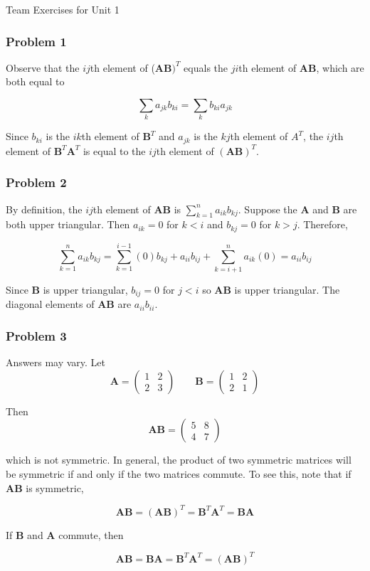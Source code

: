 \documentclass{beamer}
\begin{document}
\begin{frame}
\begin{center}
\Huge Team Exercises for Unit 1
\end{center}
\end{frame}

\begin{frame}
\frametitle{Problem 1}
Observe that the $ij$th element of ($\mathbf{AB})^T$ equals the $ji$th element of $\mathbf{AB}$, which are both equal to 

$$ \sum_k a_{jk}b_{ki} = \sum_k b_{ki} a_{jk}$$

Since $b_{ki}$ is the $ik$th element of $\mathbf{B}^T$ and $a_{jk}$ is the $kj$th element of $A^T$, the $ij$th element of $\mathbf{B}^T\mathbf{A}^T$ is equal to the $ij$th element of $\mathbf{(AB)}^T$.
\end{frame}

\begin{frame}
\frametitle{Problem 2}
By definition, the $ij$th element of $\mathbf{AB}$ is $\sum_{k=1}^n a_{ik} b_{kj}$.  Suppose the $\mathbf{A}$ and $\mathbf{B}$ are both upper triangular.  Then $a_{ik} = 0$ for $k < i$ and $b_{kj} = 0$ for $k > j$.  Therefore,

$$\sum_{k = 1}^n a_{ik}b_{kj} = \sum_{k = 1}^{i-1} (0)b_{kj} + a_{ii}b_{ij} + \sum_{k = i+1}^n a_{ik}(0) = a_{ii}b_{ij}$$

Since $\mathbf{B}$ is upper triangular, $b_{ij} = 0$ for $j < i$ so $\mathbf{AB}$ is upper triangular.  The diagonal elements of $\mathbf{AB}$ are $a_{ii}b_{ii}$.
\end{frame}

\begin{frame}
\frametitle{Problem 3}
Answers may vary.  Let $$\mathbf{A} = \begin{pmatrix} 1 & 2 \\ 2 & 3\end{pmatrix} \qquad \mathbf{B} = \begin{pmatrix} 1 & 2 \\ 2 & 1 \end{pmatrix}$$

Then
$$\mathbf{AB} = \begin{pmatrix} 5 & 8 \\ 4 & 7\end{pmatrix} $$

which is not symmetric.  In general, the product of two symmetric matrices will be symmetric if and only if the two matrices commute.  To see this, note that if $\mathbf{AB}$ is symmetric,

$$\mathbf{AB} = \mathbf{(AB)}^T = \mathbf{B}^T\mathbf{A}^T = \mathbf{BA}$$

If $\mathbf{B}$ and $\mathbf{A}$ commute, then

$$\mathbf{AB} = \mathbf{BA} = \mathbf{B}^T\mathbf{A}^T = \mathbf{(AB)}^T $$
\end{frame}
\end{document}
